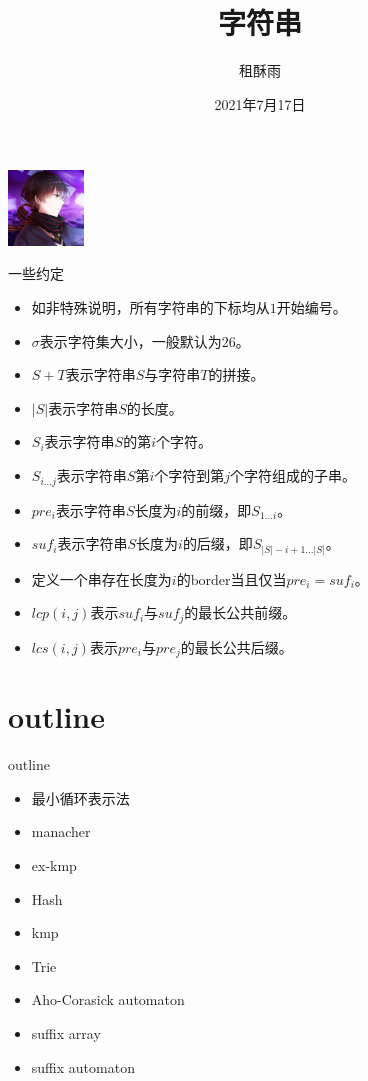 \documentclass{beamer}
\title{字符串}
\date{2021年7月17日}
\author{租酥雨}
\begin{document}
\small
	
	\begin{frame}
	\titlepage
		\begin{center}
		
		\includegraphics[width=2.0cm]{zsy.jpg}
		\end{center}
	\end{frame}

\begin{frame}{一些约定}
\begin{itemize}
	\item 如非特殊说明，所有字符串的下标均从$1$开始编号。
	\item $\sigma$表示字符集大小，一般默认为$26$。
	\item $S+T$表示字符串$S$与字符串$T$的拼接。
	\item $|S|$表示字符串$S$的长度。
	\item $S_i$表示字符串$S$的第$i$个字符。
	\item $S_{i...j}$表示字符串$S$第$i$个字符到第$j$个字符组成的子串。
	\item $pre_i$表示字符串$S$长度为$i$的前缀，即$S_{1...i}$。
	\item $suf_i$表示字符串$S$长度为$i$的后缀，即$S_{|S|-i+1...|S|}$。
	\item 定义一个串存在长度为$i$的$\mathrm{border}$当且仅当$pre_i=suf_i$。
	\item $lcp(i,j)$表示$suf_i$与$suf_j$的最长公共前缀。
	\item $lcs(i,j)$表示$pre_i$与$pre_j$的最长公共后缀。
\end{itemize}
\end{frame}

\section{outline}
\begin{frame}{outline}
\begin{itemize}
	\item 最小循环表示法
	\item manacher
	\item ex-kmp
	\item Hash
	\item kmp
	\item Trie
	\item Aho-Corasick automaton
	\item suffix array
	\item suffix automaton
\end{itemize}
\end{frame}
\end{document}
